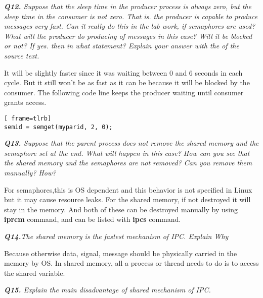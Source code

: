 \documentclass[11pt]{article}
\begin{document}
\vspace{5mm}
\textit{\textbf{Q12.} Suppose that the sleep time in the producer process is always zero, but the sleep time in the consumer is not zero. That is. the producer is capable to produce messages very fast. Can it really do this in the lab work, if semaphores are used? What will the producer do producing of messages in this case? Will it be blocked or not? If yes. then in what statement? Explain your answer with the of the source text.}
\vspace{5mm}

It will be slightly faster since it was waiting between 0 and 6 seconds in each cycle. But it still won't be as fast as it can be because it will be blocked by the consumer. The following code line keeps the producer waiting until consumer grants access.

\vspace{5mm}
\begin{minipage}{1\textwidth}
\begin{lstlisting}[ frame=tlrb]
semid = semget(myparid, 2, 0);
\end{lstlisting}
\end{minipage}

\vspace{5mm}
\textit{\textbf{Q13.} Suppose that the parent process does not remove the shared memory and the semaphore set at the end. What will happen in this case? How can you see that the shared memory and the semaphores are not removed? Can you remove them manually? How?}
\vspace{5mm}

For semaphores,this is OS dependent and this behavior is not specified in Linux but it may cause resource leaks. For the shared memory, if not destroyed it will stay in the memory. And both of these can be destroyed manually by using \textbf{iprcm} command, and can be listed with \textbf{ipcs} command.

\vspace{5mm}
\textit{\textbf{Q14.}The shared memory is the fastest mechanism of IPC. Explain Why}
\vspace{5mm}

Because otherwise data, signal, message should be physically carried in the memory by OS. In shared memory, all a process or thread needs to do is to access the shared variable.

\vspace{5mm}
\textit{\textbf{Q15.} Explain the main disadvantage of shared mechanism of IPC.}
\vspace{5mm}
\end{document}
